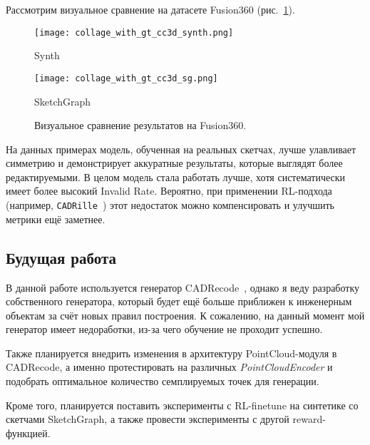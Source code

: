 Рассмотрим визуальное сравнение на датасете Fusion360 (рис.~\ref{fig:datasets1}).

\begin{figure}[h!]
    \centering
    \texttt{[image: collage\_with\_gt\_cc3d\_synth.png]}
    \caption*{Synth}
    \vspace{1em}
    \texttt{[image: collage\_with\_gt\_cc3d\_sg.png]}
    \caption*{SketchGraph}
    \caption{Визуальное сравнение результатов на Fusion360.}
    \label{fig:datasets1}
\end{figure}

На данных примерах модель, обученная на реальных скетчах, лучше улавливает симметрию и демонстрирует аккуратные результаты, которые выглядят более редактируемыми.
В целом модель стала работать лучше, хотя систематически имеет более высокий Invalid Rate.
Вероятно, при применении RL-подхода (например, \texttt{CADRille}~\cite{kolodiazhnyi25_cadrille}) этот недостаток можно компенсировать и улучшить метрики ещё заметнее.

\subsection{Будущая работа}

В данной работе используется генератор CADRecode~\cite{rukhovich24_cadrecode}, однако я веду разработку собственного генератора, который будет ещё больше приближен к инженерным объектам за счёт новых правил построения.
К сожалению, на данный момент мой генератор имеет недоработки, из-за чего обучение не проходит успешно.

Также планируется внедрить изменения в архитектуру PointCloud-модуля в CADRecode, а именно протестировать на различных \textit{PointCloudEncoder} и подобрать оптимальное количество семплируемых точек для генерации.

Кроме того, планируется поставить эксперименты с RL-finetune на синтетике со скетчами SketchGraph, а также провести эксперименты с другой reward-функцией.

\newpage